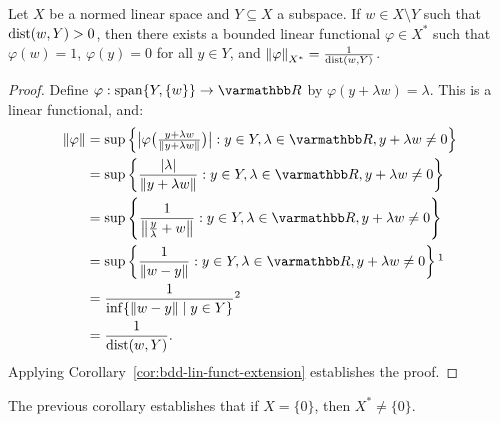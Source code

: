 \begin{corollary}\label{cor:hb-existence-of-lin-funct}
    Let $X$ be a normed linear space and $Y \subseteq X$ a subspace. If $w \in X \setminus Y$ such that $\operatorname{dist}(w,Y) > 0$, then there exists a bounded linear functional $\varphi \in X^\ast$ such that $\varphi(w) = 1$, $\varphi(y) = 0$ for all $y \in Y$, and $\left\lVert \varphi \right\rVert_{X^\ast} = \frac{1}{\operatorname{dist}(w,Y)}$.
\end{corollary}
    \begin{proof}
        Define $\varphi:\Span\{Y,\{w\}\} \rightarrow \bfR$ by $\varphi(y + \lambda w) = \lambda$. This is a linear functional, and:
            \begin{equation*}
            \begin{split}
                \lnorm \varphi \rnorm 
                & = \sup \left\{ \bigl| \varphi \bigl( {\ts\frac{y + \lambda w}{ \lnorm y + \lambda w \rnorm}}\bigr)\bigr| : y \in Y, \lambda \in \bfR, y+\lambda w \neq 0\right\} \\
                & = \sup \left\{  { \frac{|\lambda|}{ \lnorm y + \lambda w \rnorm}} : y \in Y, \lambda \in \bfR, y+\lambda w \neq 0\right\} \\
                & = \sup \left\{  { \frac{1}{ \lnorm \frac{y}{\lambda} + w \rnorm}} : y \in Y, \lambda \in \bfR, y+\lambda w \neq 0\right\} \\
                & = \sup \left\{  { \frac{1}{ \lnorm w-y \rnorm}} : y \in Y, \lambda \in \bfR, y+\lambda w \neq 0\right\}\footnotemark\\
                & = \frac{1}{\inf \{ \lnorm w - y \rnorm \mid y \in Y\}}\footnotemark\\
                & = \frac{1}{\dist(w,Y)}.
            \end{split}
            \end{equation*}
        Applying Corollary~\ref{cor:bdd-lin-funct-extension} establishes the proof.
    \end{proof}

\begin{remark}
    The previous corollary establishes that if $X = \{0\}$, then $X^\ast \neq \{0\}$.
\end{remark}

